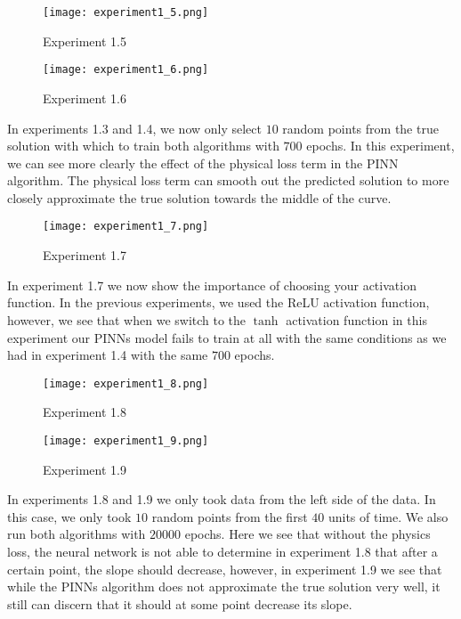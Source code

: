 \documentclass{article}
\begin{document}
\begin{figure}[H]
    \centering
    \texttt{[image: experiment1\_5.png]}
    \caption{Experiment 1.5}
\end{figure}

\begin{figure}[H]
    \centering
    \texttt{[image: experiment1\_6.png]}
    \caption{Experiment 1.6}
\end{figure}

In experiments 1.3 and 1.4, we now only select $10$ random points from the true solution with which to train both algorithms with $700$ epochs. In this experiment, we can see more clearly the effect of the physical loss term in the PINN algorithm. The physical loss term can smooth out the predicted solution to more closely approximate the true solution towards the middle of the curve. 

\begin{figure}[H]
    \centering
    \texttt{[image: experiment1\_7.png]}
    \caption{Experiment 1.7}
\end{figure}

In experiment 1.7 we now show the importance of choosing your activation function. In the previous experiments, we used the ReLU activation function, however, we see that when we switch to the $\tanh$ activation function in this experiment our PINNs model fails to train at all with the same conditions as we had in experiment 1.4 with the same $700$ epochs.

\begin{figure}[H]
    \centering
    \texttt{[image: experiment1\_8.png]}
    \caption{Experiment 1.8}
\end{figure}

\begin{figure}[H]
    \centering
    \texttt{[image: experiment1\_9.png]}
    \caption{Experiment 1.9}
\end{figure}

In experiments 1.8 and 1.9 we only took data from the left side of the data. In this case, we only took $10$ random points from the first $40$ units of time. We also run both algorithms with $20000$ epochs. Here we see that without the physics loss, the neural network is not able to determine in experiment 1.8 that after a certain point, the slope should decrease, however, in experiment 1.9 we see that while the PINNs algorithm does not approximate the true solution very well, it still can discern that it should at some point decrease its slope.
\end{document}
